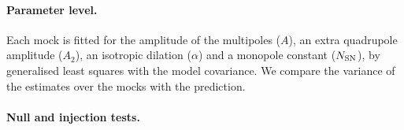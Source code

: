 \paragraph{Parameter level.} Each mock is fitted for the amplitude of the multipoles ($A$), an extra quadrupole amplitude ($A_2$), an isotropic dilation ($\alpha$) and a monopole constant ($N_{\rm SN}$), by generalised least squares with the model covariance. We compare the variance of the estimates over the mocks with the prediction.

\paragraph{Null and injection tests.} 
